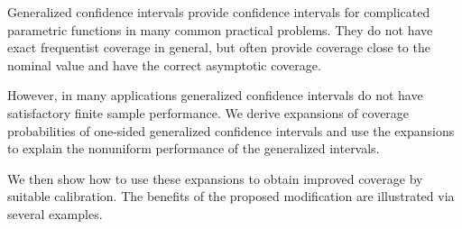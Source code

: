 


Generalized confidence intervals provide confidence intervals for complicated parametric functions 
in many common practical problems. They do not have exact frequentist coverage in general, but often
provide coverage close to the nominal value and have the correct asymptotic coverage. 

However, in many applications generalized confidence intervals do not have satisfactory finite sample 
performance. We derive expansions of coverage probabilities of one-sided generalized confidence intervals 
and use the expansions to explain the nonuniform performance of the generalized intervals. 

We then show how to use these expansions to obtain improved coverage by suitable calibration.
The benefits of the proposed modification are illustrated via several examples.

